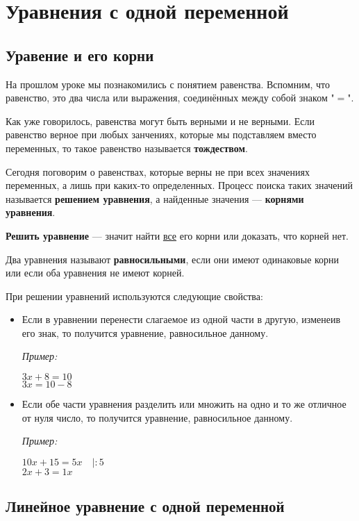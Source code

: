 \documentclass[12pt, a4paper]{article}
\begin{document}
		
	
	\section*{Уравнения с одной переменной}
	\subsection*{Уравение и его корни}
	На прошлом уроке мы познакомились с понятием равенства. Вспомним, что равенство, это два числа или выражения, соединённых между собой знаком "$=$".
	
	Как уже говорилось, равенства могут быть верными и не верными. Если равенство верное при любых занчениях, которые мы подставляем вместо переменных, то такое равенство называется \textbf{тождеством}.
	
	Сегодня поговорим о равенствах, которые верны не при всех значениях переменных, а лишь при каких-то определенных. Процесс поиска таких значений называется \textbf{решением уравнения}, а найденные значения — \textbf{корнями уравнения}.
	
	\textbf{Решить уравнение} — значит найти \underline{все} его корни или доказать, что корней нет.
	
	Два уравнения называют \textbf{равносильными}, если они имеют одинаковые корни или если оба уравнения не имеют корней.
	
	При решении уравнений используются следующие свойства:
	\begin{itemize}
		\item Если в уравнении перенести слагаемое из одной части в другую, изменеив его знак, то получится уравнение, равносильное данному.
		
		\textit{Пример:}
		\begin{center}
			$3x+8=10$\\
			$3x=10-8$
		\end{center}
		\item Если обе части уравнения разделить или множить на одно и то же отличное от нуля число, то получится уравнение, равносильное данному.
		
		\textit{Пример:}
		\begin{center}
			$10x+15=5x\quad|:5 $\\
			$2x+3=1x$
		\end{center}
	\end{itemize}


	\subsection*{Линейное уравнение с одной переменной}
	
\end{document}
